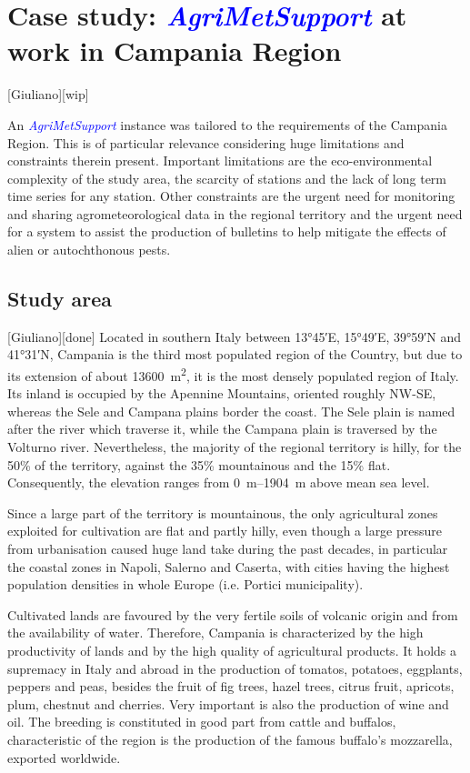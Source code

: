\documentclass[authoryear,preprint,review,12pt]{elsarticle}
\newcommand{\update}[1]{\emph{\textcolor{blue}{#1}}}
\newcommand{\gci}{\update{AgriMetSupport}\xspace}
\begin{document}
\section{Case study: \gci at work in Campania Region}[Giuliano][wip] \label{sec:casestudy}

An \gci instance was tailored to the requirements of the Campania Region.
This is of particular relevance considering huge limitations and constraints therein present.
Important limitations are the eco-environmental complexity of the study area, the scarcity of stations and the lack of long term time series for any station.
Other constraints are the urgent need for monitoring and sharing agrometeorological data in the regional territory %
and the urgent need for a system to assist the production of bulletins to help mitigate the effects of alien or autochthonous pests.
 
\subsection{Study area}[Giuliano][done]
Located in southern Italy between \ang{13;45;}E, \ang{15;49;}E, \ang{39;59;}N and \ang{41;31;}N, Campania is the third most populated region of the Country, but due to its extension of about \SI{13600}{\metre\squared}, it is the most densely populated region of Italy.
Its inland is occupied by the Apennine Mountains, oriented roughly NW-SE, whereas the Sele and Campana plains border the coast.
The Sele plain is named after the river which traverse it, while the Campana plain is traversed by the Volturno river.
Nevertheless, the majority of the regional territory is hilly, for the 50\% of the territory, against the 35\% mountainous and the 15\% flat.
Consequently, the elevation ranges from \SIrange{0}{1904}{\metre} above mean sea level.

Since a large part of the territory is mountainous, the only agricultural zones exploited for cultivation are flat and partly hilly, even though a large pressure from urbanisation caused huge land take during the past decades, in particular  the coastal zones in Napoli, Salerno and Caserta, with cities having the highest population densities in whole Europe (i.e. Portici municipality).

Cultivated lands are favoured by the very fertile soils of volcanic origin and from the availability of water. 
Therefore, Campania is characterized by the high productivity of lands and by the high quality of agricultural products.
It holds a supremacy in Italy and abroad in the production of tomatos, potatoes, eggplants, peppers and peas, besides the fruit of fig trees, hazel trees, citrus fruit, apricots, plum, chestnut and cherries. 
Very important is also the production of wine and oil.
The breeding is constituted in good part from cattle and buffalos, characteristic of the region is the production of the famous buffalo's mozzarella, exported worldwide.
\end{document}
